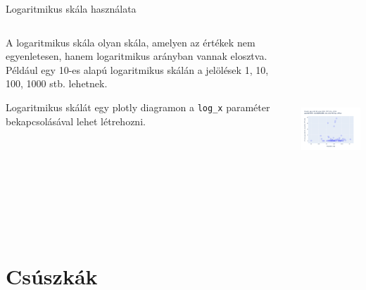 \documentclass[english, aspectratio=169]{beamer}
\makeatletter
\let\origtableofcontents=\tableofcontents
\def\tableofcontents{\@ifnextchar[{\origtableofcontents}{\gobbletableofcontents}}
\def\gobbletableofcontents#1{\origtableofcontents}
\makeatother
\begin{document}
	\begin{frame}{Logaritmikus skála használata}
		\begin{columns}
			\begin{column}{.5\textwidth}
				A logaritmikus skála olyan skála, amelyen az értékek nem egyenletesen, hanem logaritmikus arányban vannak elosztva. Például egy 10-es alapú logaritmikus skálán a jelölések 1, 10, 100, 1000 stb. lehetnek.\par\medskip
				Logaritmikus skálát egy plotly diagramon a \texttt{log\_x} paraméter bekapcsolásával lehet létrehozni. 
			\end{column}
			\begin{column}{.5\textwidth}
				\begin{center}
					\includegraphics[width=7cm, height=7cm, keepaspectratio]{images/scatter_15.png}
				\end{center}
				\end{column}
		\end{columns}
	\end{frame}
	
	\section{Csúszkák}
	
	\begin{frame}{}
		\tableofcontents[currentsection]
	\end{frame}
	
\end{document}
